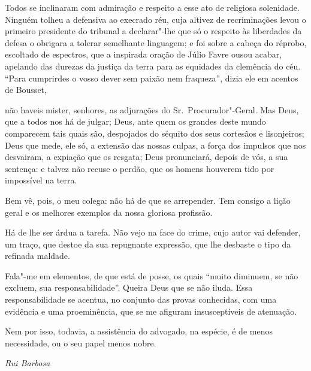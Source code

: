 Todos se inclinaram com admiração e respeito a esse ato
de religiosa solenidade. Ninguém tolheu a defensiva ao execrado réu,
cuja altivez de recriminações levou o primeiro presidente do tribunal a
declarar"-lhe que só o respeito às liberdades da defesa o obrigara a
tolerar semelhante linguagem; e foi sobre a cabeça do réprobo, 
escoltado de espectros, que a inspirada oração de Júlio Favre ousou
acabar, apelando das durezas da justiça da terra para as equidades da
clemência do céu. “Para cumprirdes o vosso dever sem paixão nem
fraqueza”, dizia ele em acentos de Bousset, 

\begin{hedraquote}
não haveis mister,
senhores, as adjurações do Sr.~Procurador"-Geral. Mas Deus, que a todos
nos há de julgar; Deus, ante quem os grandes deste mundo comparecem
tais quais são, despojados do séquito dos seus cortesãos e lisonjeiros;
Deus que mede, ele só, a extensão das nossas culpas, a força dos
impulsos que nos desvairam, a expiação que os resgata; Deus
pronunciará, depois de vós, a sua sentença: e talvez não recuse o
perdão, que os homens houverem tido por impossível na terra. 
\end{hedraquote}

Bem vê, pois, o meu colega: não há de que se arrepender. Tem consigo a lição
geral e os melhores exemplos da nossa gloriosa profissão. 

Há de lhe ser árdua a tarefa. Não vejo na face do crime, cujo autor vai defender,
um traço, que destoe da sua repugnante expressão, que lhe desbaste o
tipo da refinada maldade. 

Fala"-me em elementos, de que está de posse,
os quais “muito diminuem, se não excluem, sua responsabilidade”. Queira
Deus que se não iluda. Essa responsabilidade se acentua, no conjunto
das provas conhecidas, com uma evidência e uma proeminência, que se me
afiguram insusceptíveis de atenuação. 

Nem por isso, todavia, a assistência do advogado, na espécie, 
é de menos necessidade, ou o seu papel menos nobre. 
\bigskip

\hfill\textit{Rui Barbosa} 

\endgroup
\clearpage
